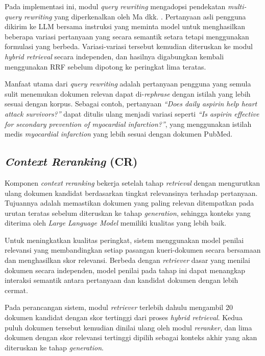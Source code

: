 Pada implementasi ini, modul \textit{query rewriting} mengadopsi pendekatan \textit{multi-query rewriting} yang diperkenalkan oleh Ma dkk. \parencite{ma2023queryrewriting}. Pertanyaan asli pengguna dikirim ke LLM bersama instruksi yang meminta model untuk menghasilkan beberapa variasi pertanyaan yang secara semantik setara tetapi menggunakan formulasi yang berbeda. Variasi-variasi tersebut kemudian diteruskan ke modul \textit{hybrid retrieval} secara independen, dan hasilnya digabungkan kembali menggunakan RRF sebelum dipotong ke peringkat lima teratas.

Manfaat utama dari \textit{query rewriting} adalah pertanyaan pengguna yang semula sulit menemukan dokumen relevan dapat di-\textit{rephrase} dengan istilah yang lebih sesuai dengan korpus. Sebagai contoh, pertanyaan \textit{``Does daily aspirin help heart attack survivors?''} dapat ditulis ulang menjadi variasi seperti \textit{``Is aspirin effective for secondary prevention of myocardial infarction?''}, yang menggunakan istilah medis \textit{myocardial infarction} yang lebih sesuai dengan dokumen PubMed.

\subsection{\textit{Context Reranking} (CR)}
\label{subsec:context-reranking}

Komponen \textit{context reranking} bekerja setelah tahap \textit{retrieval} dengan mengurutkan ulang dokumen kandidat berdasarkan tingkat relevansinya terhadap pertanyaan. Tujuannya adalah memastikan dokumen yang paling relevan ditempatkan pada urutan teratas sebelum diteruskan ke tahap \textit{generation}, sehingga konteks yang diterima oleh \textit{Large Language Model} memiliki kualitas yang lebih baik.

Untuk meningkatkan kualitas peringkat, sistem menggunakan model penilai relevansi yang membandingkan setiap pasangan kueri-dokumen secara bersamaan dan menghasilkan skor relevansi. Berbeda dengan \textit{retriever} dasar yang menilai dokumen secara independen, model penilai pada tahap ini dapat menangkap interaksi semantik antara pertanyaan dan kandidat dokumen dengan lebih cermat.

Pada perancangan sistem, modul \textit{retriever} terlebih dahulu mengambil 20 dokumen kandidat dengan skor tertinggi dari proses \textit{hybrid retrieval}. Kedua puluh dokumen tersebut kemudian dinilai ulang oleh modul \textit{reranker}, dan lima dokumen dengan skor relevansi tertinggi dipilih sebagai konteks akhir yang akan diteruskan ke tahap \textit{generation}.

